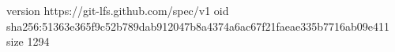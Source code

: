version https://git-lfs.github.com/spec/v1
oid sha256:51363e365f9c52b789dab912047b8a4374a6ac67f21faeae335b7716ab09e411
size 1294
